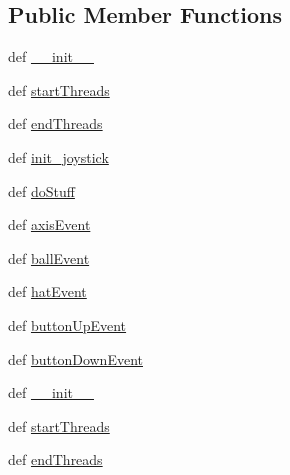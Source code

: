 \subsection*{Public Member Functions}
\begin{DoxyCompactItemize}
\item 
def \hyperlink{classdriver_1_1LOGITECH__GAMEPAD__DRIVER_1_1LogitechGamepadDriver_a0596aa8f4588a8da0c0b71872b395986}{\+\_\+\+\_\+init\+\_\+\+\_\+}
\item 
def \hyperlink{classdriver_1_1LOGITECH__GAMEPAD__DRIVER_1_1LogitechGamepadDriver_ac2d985524837767781fc23f98b0b9f1c}{start\+Threads}
\item 
def \hyperlink{classdriver_1_1LOGITECH__GAMEPAD__DRIVER_1_1LogitechGamepadDriver_a75f646d45328d1d681078c628356319d}{end\+Threads}
\item 
def \hyperlink{classdriver_1_1LOGITECH__GAMEPAD__DRIVER_1_1LogitechGamepadDriver_af8b7c039fa3c2d31c9bee1d8ffbd2394}{init\+\_\+joystick}
\item 
def \hyperlink{classdriver_1_1LOGITECH__GAMEPAD__DRIVER_1_1LogitechGamepadDriver_a81633b2b971356a16e16e552b70d973a}{do\+Stuff}
\item 
def \hyperlink{classdriver_1_1LOGITECH__GAMEPAD__DRIVER_1_1LogitechGamepadDriver_af534f9fabdc96f6e6e7f889cb67bbe0e}{axis\+Event}
\item 
def \hyperlink{classdriver_1_1LOGITECH__GAMEPAD__DRIVER_1_1LogitechGamepadDriver_a43c119947b811d1a561aeaf29bd8bef6}{ball\+Event}
\item 
def \hyperlink{classdriver_1_1LOGITECH__GAMEPAD__DRIVER_1_1LogitechGamepadDriver_afa596d45a8aeb41b5773bd6e9bf53732}{hat\+Event}
\item 
def \hyperlink{classdriver_1_1LOGITECH__GAMEPAD__DRIVER_1_1LogitechGamepadDriver_aa516c51733f911fd0867c729de0dd82e}{button\+Up\+Event}
\item 
def \hyperlink{classdriver_1_1LOGITECH__GAMEPAD__DRIVER_1_1LogitechGamepadDriver_a676dc9961a7f393c02d49af409ad3844}{button\+Down\+Event}
\item 
def \hyperlink{classdriver_1_1LOGITECH__GAMEPAD__DRIVER_1_1LogitechGamepadDriver_a0596aa8f4588a8da0c0b71872b395986}{\+\_\+\+\_\+init\+\_\+\+\_\+}
\item 
def \hyperlink{classdriver_1_1LOGITECH__GAMEPAD__DRIVER_1_1LogitechGamepadDriver_ac2d985524837767781fc23f98b0b9f1c}{start\+Threads}
\item 
def \hyperlink{classdriver_1_1LOGITECH__GAMEPAD__DRIVER_1_1LogitechGamepadDriver_a75f646d45328d1d681078c628356319d}{end\+Threads}

\end{DoxyCompactItemize}
